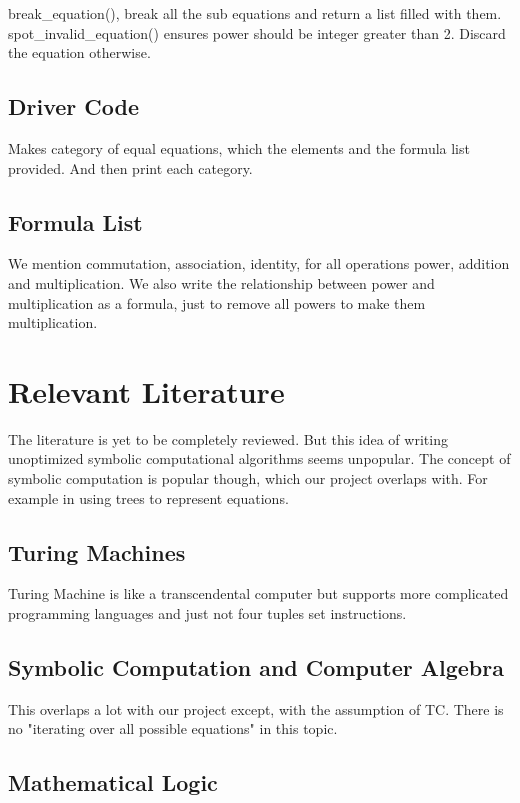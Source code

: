 \documentclass{book}
\begin{document}
break\_equation(), break all the sub equations and return a list filled with them. spot\_invalid\_equation() ensures power should be integer greater than 2. Discard the equation otherwise.

\section{Driver Code}

Makes category of equal equations, which the elements and the formula list provided. And then print each category.

\section{Formula List}

We mention commutation, association, identity, for all operations power, addition and multiplication. We also write the relationship between power and multiplication as a formula, just to remove all powers to make them multiplication. 

\chapter{Relevant Literature}

The literature is yet to be completely reviewed. But this idea of writing unoptimized symbolic computational algorithms seems unpopular. The concept of symbolic computation is popular though, which our project overlaps with. For example in using trees to represent equations.

\section{Turing Machines}

Turing Machine is like a transcendental computer but supports more complicated programming languages and just not four tuples set instructions. 

\section{Symbolic Computation and Computer Algebra}

This overlaps a lot with our project except, with the assumption of TC. There is no "iterating over all possible equations" in this topic. 

\section{Mathematical Logic}
\end{document}
